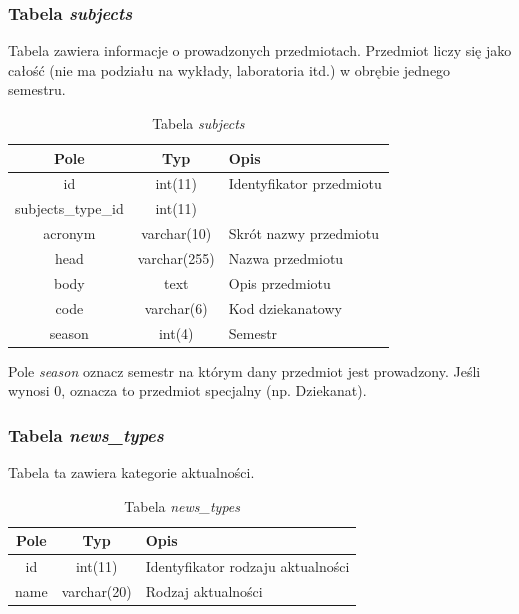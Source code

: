 \documentclass[a4paper,12pt,oneside]{report}
\begin{document}
\newpage
\subsubsection{Tabela \emph{subjects}}
\label{subsub:subjects}
Tabela zawiera informacje o prowadzonych przedmiotach. Przedmiot liczy się jako całość (nie ma podziału na wykłady, laboratoria itd.) w obrębie jednego semestru.

\begin{table}[h]
  \centering
  \begin{tabular}{|c|c|l|}\hline
  Pole & Typ & Opis \\\hline
  id                 & int(11)      & Identyfikator przedmiotu\\
  subjects\_type\_id & int(11)      & \\
  acronym            & varchar(10)  & Skrót nazwy przedmiotu\\
  head               & varchar(255) & Nazwa przedmiotu \\
  body               & text         & Opis przedmiotu \\
  code               & varchar(6)   & Kod dziekanatowy \\
  season             & int(4)       & Semestr \\\hline
  \end{tabular}
  \caption{Tabela \emph{subjects}\label{tab:subjects}}
\end{table}

Pole \emph{season} oznacz semestr na którym dany przedmiot jest prowadzony. Jeśli wynosi 0, oznacza to przedmiot specjalny (np. Dziekanat).

\subsubsection{Tabela \emph{news\_types}}
\label{subsub:news_types}
Tabela ta zawiera kategorie aktualności.

\begin{table}[h]
  \centering
  \begin{tabular}{|c|c|l|}\hline
  Pole & Typ & Opis \\\hline
  id              & int(11)      & Identyfikator rodzaju aktualności\\
  name & varchar(20) & Rodzaj aktualności \\\hline
  \end{tabular}
  \caption{Tabela \emph{news\_types}\label{tab:news_types}}
\end{table}
\end{document}
